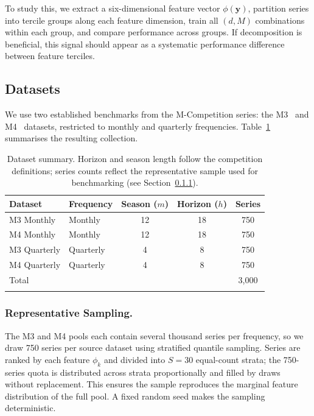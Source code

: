 \documentclass[pdflatex,sn-mathphys-num]{sn-jnl}
\theoremstyle{thmstyleone}
\theoremstyle{thmstyletwo}
\theoremstyle{thmstylethree}
\begin{document}
To study this, we extract a six-dimensional feature vector $\phi(\mathbf{y})$,
partition series into tercile groups along each feature dimension,
train all $(d, M)$ combinations within each group, and compare performance across
groups. If decomposition is beneficial, this signal should appear as a systematic
performance difference between feature terciles.

\subsection{Datasets}\label{sec:data}

We use two established benchmarks from the M-Competition series:
the M3~\cite{makridakis2000m3} and M4~\cite{makridakis2020m4} datasets,
restricted to monthly and quarterly frequencies.
Table~\ref{tab:datasets} summarises the resulting collection.

\begin{table}[ht]
\caption{Dataset summary. Horizon and season length follow the competition
definitions; series counts reflect the representative sample used for
benchmarking (see Section~\ref{sec:sampling}).}\label{tab:datasets}
\begin{tabular}{llccc}
\toprule
\textbf{Dataset} & \textbf{Frequency} & \textbf{Season ($m$)} &
\textbf{Horizon ($h$)} & \textbf{Series} \\
\midrule
M3 Monthly    & Monthly   & 12 & 18 & 750 \\
M4 Monthly    & Monthly   & 12 & 18 & 750 \\
M3 Quarterly  & Quarterly & 4  & 8  & 750 \\
M4 Quarterly  & Quarterly & 4  & 8  & 750 \\
\midrule
\multicolumn{4}{l}{Total} & 3{,}000 \\
\botrule
\end{tabular}
\end{table}

\subsubsection{Representative Sampling.}\label{sec:sampling}

The M3 and M4 pools each contain several thousand series per frequency, so we
draw 750 series per source dataset using stratified quantile sampling.
Series are ranked by each feature $\phi_k$ and divided into $S = 30$ equal-count
strata; the 750-series quota is distributed across strata proportionally and filled
by draws without replacement.
This ensures the sample reproduces the marginal feature distribution of the full pool.
A fixed random seed makes the sampling deterministic.
\end{document}
